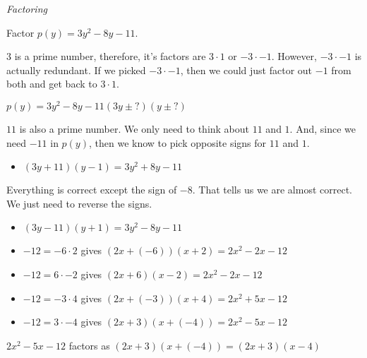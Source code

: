 \documentclass{ximera}
\begin{document}
\begin{example} \textit{Factoring}

Factor $p(y) = 3 y^2 - 8 y - 11$.


$3$ is a prime number, therefore, it's factors are $3 \cdot 1$ or $-3 \cdot -1$. However, $-3 \cdot -1$ is actually redundant.  If we picked $-3 \cdot -1$, then we could just factor out $-1$ from both and get back to $3 \cdot 1$.


$p(y) = 3 y^2 - 8 y - 11 (3y \pm ?) (y \pm ?) $


$11$ is also a prime number. We only need to think about $11$ and $1$. And, since we need $-11$ in $p(y)$, then we know to pick opposite signs for $11$ and $1$.



\begin{itemize}
\item $(3y + 11) (y - 1) = 3 y^2 + 8 y - 11$
\end{itemize}

Everything is correct except the sign of $-8$. That tells us we are almost correct. We just need to reverse the signs.


\begin{itemize}
\item $(3y - 11) (y + 1) = 3 y^2 - 8 y - 11$
\end{itemize}





\begin{itemize}

\item $-12 = -6 \cdot 2$ gives $(2 x + (-6)) (x + 2) = 2 x^2 - 2 x - 12$
\item $-12 = 6 \cdot -2$ gives $(2 x + 6) (x - 2) = 2 x^2 - 2 x -12$
\item $-12 = -3 \cdot 4$ gives $(2 x + (-3)) (x + 4) = 2 x^2 + 5 x - 12$
\item $-12 = 3 \cdot -4$ gives $(2 x + 3) (x + (-4)) = 2 x^2 - 5 x -12$
\end{itemize}

$2 x^2 - 5 x - 12$ factors as $(2 x + 3) (x + (-4)) = (2 x + 3)(x - 4)$

\end{example}
\end{document}
